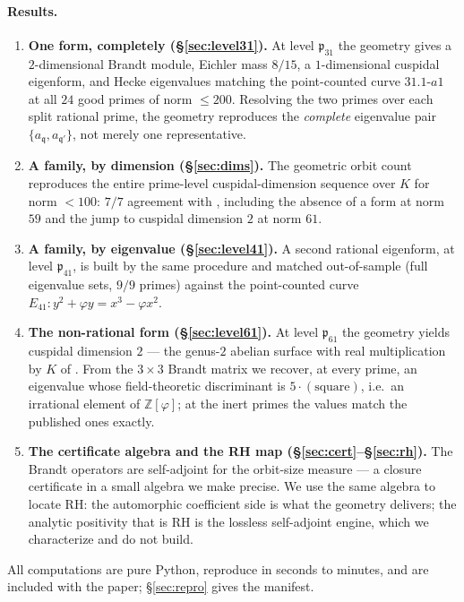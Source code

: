 \documentclass[11pt,a4paper]{article}
\newcommand{\Z}{\mathbb{Z}}
\newcommand{\fp}{\mathfrak{p}}
\newcommand{\fq}{\mathfrak{q}}
\begin{document}
\paragraph{Results.}
\begin{enumerate}[leftmargin=2em]
\item \textbf{One form, completely (\S\ref{sec:level31}).} At level
$\fp_{31}$ the geometry gives a $2$-dimensional Brandt module, Eichler
mass $8/15$, a $1$-dimensional cuspidal eigenform, and Hecke
eigenvalues matching the point-counted curve $31.1\text{-}a1$ at all
$24$ good primes of norm ${\le}200$. Resolving the two primes over each
split rational prime, the geometry reproduces the \emph{complete}
eigenvalue pair $\{a_\fq,a_{\fq'}\}$, not merely one representative.
\item \textbf{A family, by dimension (\S\ref{sec:dims}).} The geometric
orbit count reproduces the entire prime-level cuspidal-dimension
sequence over $K$ for norm ${<}100$: $7/7$ agreement with
\cite{Dembele2005}, including the absence of a form at norm $59$ and
the jump to cuspidal dimension $2$ at norm $61$.
\item \textbf{A family, by eigenvalue (\S\ref{sec:level41}).} A second
rational eigenform, at level $\fp_{41}$, is built by the same procedure
and matched out-of-sample (full eigenvalue sets, $9/9$ primes) against
the point-counted curve $E_{41}:y^2+\varphi y=x^3-\varphi x^2$.
\item \textbf{The non-rational form (\S\ref{sec:level61}).} At level
$\fp_{61}$ the geometry yields cuspidal dimension $2$ --- the
genus-$2$ abelian surface with real multiplication by $K$ of
\cite[Rem.~4.4]{Dembele2005}. From the $3\times3$ Brandt matrix we
recover, at every prime, an eigenvalue whose field-theoretic
discriminant is $5\cdot(\text{square})$, i.e.\ an irrational element of
$\Z[\varphi]$; at the inert primes the values match the published
ones exactly.
\item \textbf{The certificate algebra and the RH map
(\S\ref{sec:cert}--\S\ref{sec:rh}).} The Brandt operators are
self-adjoint for the orbit-size measure --- a closure certificate in a
small algebra we make precise. We use the same algebra to locate RH:
the automorphic coefficient side is what the geometry delivers; the
analytic positivity that is RH is the lossless self-adjoint engine,
which we characterize and do not build.
\end{enumerate}

All computations are pure Python, reproduce in seconds to minutes, and
are included with the paper; \S\ref{sec:repro} gives the manifest.
\end{document}
